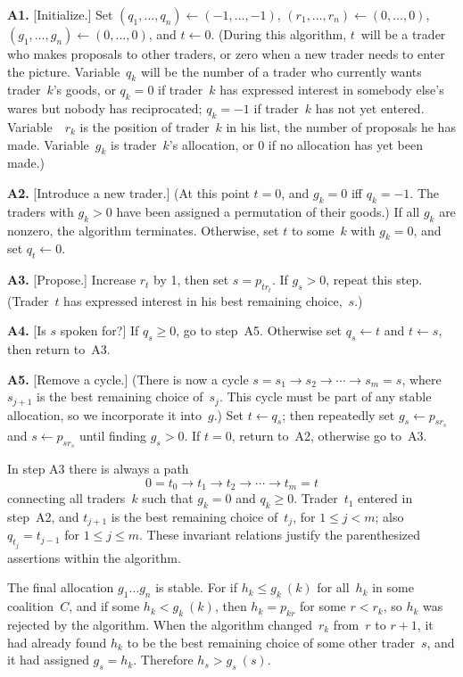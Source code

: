 {\narrower\smallskip\noindent
{\bf A1.} [Initialize.] Set $(q_1,\ldots,q_n)\leftarrow (-1,\ldots,-1)$, 
$(r_1,\ldots,r_n)\leftarrow (0,\ldots,0)$, $(g_1,\ldots,g_n)\leftarrow
(0,\ldots,0)$, and $t\leftarrow 0$. (During this algorithm, $t$~will be a
trader who makes proposals to other traders, or zero when a new trader needs to
enter the picture. Variable~$q_k$ will be the number of a trader who currently
wants trader~$k$'s goods, or $q_k=0$ if trader~$k$ has expressed interest in
somebody else's wares but nobody has reciprocated; $q_k=-1$ if trader~$k$ has
not yet entered. Variable~~$r_k$ is the position of trader~$k$ in his list,
the number of proposals he has made.
Variable~$g_k$ is trader~$k$'s allocation, or 0 if no allocation has yet been
made.)

\smallskip\noindent
{\bf A2.} [Introduce a new trader.] (At this point $t=0$, and $g_k=0$ iff
$q_k=-1$. The traders with $g_k>0$ have been assigned a permutation of their
goods.) If all $g_k$ are nonzero, the algorithm terminates. Otherwise, set $t$
to some~$k$ with $g_k=0$, and set $q_t\leftarrow 0$.

\smallskip\noindent
{\bf A3.} [Propose.] Increase $r_t$ by 1, then set $s=p_{tr_t}$. If $g_s>0$,
repeat this step. (Trader~$t$ has expressed interest in his best remaining
choice,~$s$.) 

\smallskip\noindent
{\bf A4.} [Is $s$ spoken for?] If $q_s\geq 0$, go to step~A5. Otherwise set
$q_s\leftarrow t$ and $t\leftarrow s$, then return to~A3.

\smallskip\noindent
{\bf A5.} [Remove a cycle.] (There is now a cycle $s=s_1\rightarrow
s_2\rightarrow \cdots\rightarrow s_m=s$, where $s_{j+1}$ is the best remaining
choice of~$s_j$. This cycle must be part of any stable allocation, so we
incorporate it into~$g$.) Set $t\leftarrow q_s$; then repeatedly set
$g_s\leftarrow p_{sr_s}$ and $s\leftarrow p_{sr_s}$ until finding $g_s>0$. If
$t=0$, return to~A2, otherwise go to~A3.\quad\pfbox
\smallskip}

\smallskip
In step A3 there is always a path
$$0=t_0\rightarrow t_1\rightarrow t_2\rightarrow \cdots \rightarrow t_m=t$$
connecting all traders~$k$ such that $g_k=0$ and $q_k\geq 0$. Trader~$t_1$
entered in step~A2, and $t_{j+1}$ is the best remaining choice of~$t_j$, for
$1\leq j<m$; also $q_{t_j}=t_{j-1}$ for $1\leq j\leq m$. These invariant
relations justify the parenthesized assertions within the algorithm.

The final allocation $g_1\ldots g_n$ is stable. For if $h_k\leq g_k\ (k)$ for
all~$h_k$ in some coalition~$C$, and if some $h_k<g_k\ (k)$, then $h_k=p_{kr}$
for some $r<r_k$, so $h_k$ was rejected by the algorithm. 
When the algorithm changed~$r_k$ from~$r$ to $r+1$, it had already found $h_k$
to be the best remaining choice of some other trader~$s$, and it had assigned
$g_s=h_k$. Therefore $h_s>g_s\ (s)$. 

